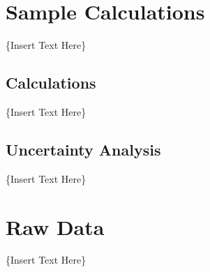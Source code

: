 \documentclass[12pt, letterpaper]{article}
\begin{document}
	\clearpage
	\printbibliography[heading=bibintoc]
	\newpage
        
	\begin{appendix}
		\renewcommand*{\thepage}{A\arabic{page}}
		
		\section{Sample Calculations}
		\{Insert Text Here\}
		
		\subsection{Calculations}
		\{Insert Text Here\}
		\newpage
		
		\subsection{Uncertainty Analysis}
		\{Insert Text Here\}
		\newpage
		\renewcommand*{\thepage}{B\arabic{page}}
		
		\section{Raw Data}
		\{Insert Text Here\}
		\newpage
	\end{appendix}
\end{document}

